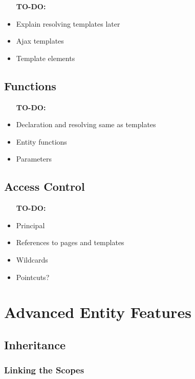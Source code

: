       \begin{itemize}
        \item [\textbf{TO-DO:}]
        \item Explain resolving templates later
        \item Ajax templates
        \item Template elements
      \end{itemize}

    \subsection{\label{subsec:simple-functions}Functions}

      \begin{itemize}
        \item [\textbf{TO-DO:}]
        \item Declaration and resolving same as templates
        \item Entity functions
        \item Parameters
      \end{itemize}

    \subsection{\label{subsec:access-control}Access Control}

      \begin{itemize}
        \item [\textbf{TO-DO:}]
        \item Principal
        \item References to pages and templates
        \item Wildcards
        \item Pointcuts?
      \end{itemize}

  \section{\label{sec:advanced-entity-features}Advanced Entity Features}
  
    \subsection{\label{subsec:inheritance}Inheritance}

      \subsubsection{Linking the Scopes}

